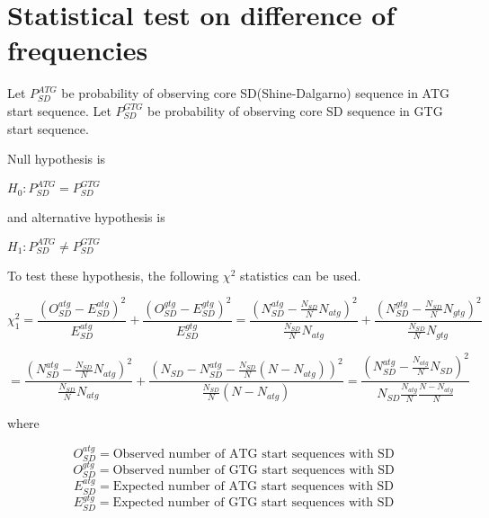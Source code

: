 \section{Statistical test on difference of frequencies}

Let \(P^{ATG}_{SD}\) be probability of observing core SD(Shine-Dalgarno)
sequence in ATG start sequence. 
Let \(P^{GTG}_{SD}\) be probability of observing core SD
sequence in GTG start sequence. 

\vspace{1em}

\noindent
Null hypothesis is

\vspace{1em}

\(H_{0} : P^{ATG}_{SD} = P^{GTG}_{SD}\)

\vspace{1em} 

\noindent
and alternative hypothesis is

\vspace{1em}

\(H_{1} : P^{ATG}_{SD} \neq P^{GTG}_{SD}\)
 
\vspace{1em}

\noindent
To test these hypothesis, the following \(\chi^{2}\) statistics can be
used.

\vspace{1em}

\[
\chi^{2}_{1} = \frac{(O^{atg}_{SD} - E^{atg}_{SD})^{2}}{E^{atg}_{SD}}
 + \frac{(O^{gtg}_{SD} - E^{gtg}_{SD})^2}{E^{gtg}_{SD}} =
 \frac{ (N^{atg}_{SD} - \frac{N_{SD}}{N}N_{atg})^2 }{
   \frac{N_{SD}}{N}N_{atg}} + \frac{ (N^{gtg}_{SD} - \frac{N_{SD}}{N}N_{gtg})^2 }{
   \frac{N_{SD}}{N}N_{gtg}}\] 

\begin{equation}
=  \frac{ (N^{atg}_{SD} - \frac{N_{SD}}{N}N_{atg})^2 }{
   \frac{N_{SD}}{N}N_{atg}} + \frac{ (N_{SD} - N^{atg}_{SD} - 
\frac{N_{SD}}{N}(N - N_{atg}))^2 }{
   \frac{N_{SD}}{N}(N - N_{atg})}  
 = \frac{ (N^{atg}_{SD} - \frac{N_{atg}}{N}N_{SD})^2 }{ N_{SD}
 \frac{N_{atg}}{N}\frac{N - N_{atg}}{N}}
\end{equation}

\vspace{1em}

\noindent 
where

\[ O^{atg}_{SD} = \mbox{Observed number of ATG start sequences with SD} \]
\[ O^{gtg}_{SD} = \mbox{Observed number of GTG start sequences with SD} \]
\[ E^{atg}_{SD} = \mbox{Expected number of ATG start sequences with SD} \]
\[ E^{gtg}_{SD} = \mbox{Expected number of GTG start sequences with SD} \]

